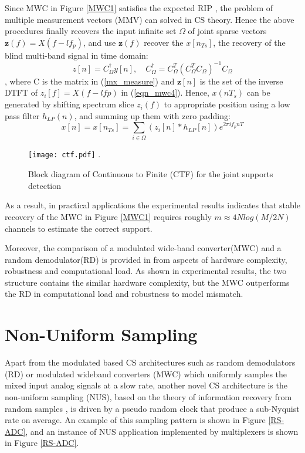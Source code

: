 Since MWC in Figure \ref{MWC1} satisfies the expected RIP \cite{mishali2009expected}, the problem of multiple measurement vectors (MMV) can solved in CS theory. Hence the above procedures finally  recovers the input infinite set $\Omega$ of joint sparse vectors $\mathbf z(f)={X(f-lf_p)}$, and use $\mathbf z(f)$ recover the $x[n_{Ts}]$, the recovery of the blind multi-band signal in time domain:
\begin{equation}
\label{eqn_zn}
z[n] = C_{\Omega}^{\dagger} y[n], \quad C_{\Omega}^{\dagger} = C_{\Omega}^T(C_{\Omega}^TC_{\Omega})^{-1}C_{\Omega}
\end{equation}
, where C is the matrix in (\ref{mx_measure}) and $\mathbf z[n]$ is the set of the inverse DTFT of $z_i[f] = X(f-lfp)$ in (\ref{eqn_mwc4}). Hence, $x(nT_s)$ can be generated by shifting spectrum slice $z_i(f)$ to appropriate position using a low pass filter $h_{LP}(n)$, and summing up them with zero padding\cite{mishali2010theory}:
\begin{equation}
x[n]=x[n_{Ts}]=\sum_{i\in\Omega} (z_i[n]*h_{LP}[n])e^{2\pi if_pnT}
\end{equation}
\begin{figure}[!t]
\centering
\texttt{[image: ctf.pdf]}
\DeclareGraphicsExtensions.
\caption{Block diagram of Continuous to Finite (CTF) for the joint supports detection}\label{ctf}
\end{figure}
\quad  As a result, in practical applications the experimental results indicates that stable recovery of the MWC in Figure \ref{MWC1} requires roughly $m \approx 4Nlog(M/2N)$ channels to estimate the correct support.

Moreover, the comparison of a modulated wide-band converter(MWC) and a random demodulator(RD) is provided in \cite{mishali2011xamplingsignal} from aspects of hardware complexity, robustness and computational load. As shown in experimental results, the two structure contains the similar hardware complexity, but the MWC outperforms the RD in computational load and robustness to model mismatch\cite{mishali2011xamplingsignal}.

\section{Non-Uniform Sampling}

Apart from the modulated based CS architectures such as random demodulators (RD) or modulated wideband converters (MWC) which uniformly samples the mixed input analog signals at a slow rate, another novel CS architecture is the non-uniform sampling (NUS), based on the theory of information recovery from random samples \cite{ragheb2007implementation}, is driven by a pseudo random clock that produce a sub-Nyquist rate on average. An example of this sampling pattern is shown in Figure \ref{RS-ADC}, and an instance of NUS application implemented by multiplexers is shown in Figure \ref{RS-ADC}.

